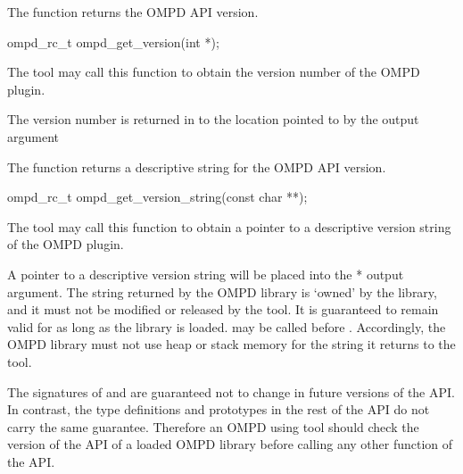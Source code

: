 \label{ompd:ompd_get_version}

\summary
The  function returns the OMPD API version.

\format

\begin{cspecific}
\begin{ompSyntax}
ompd_rc_t ompd_get_version(int *);
\end{ompSyntax}
\end{cspecific}


\descr
The tool may call this function to obtain the version number of the OMPD plugin.

\argdesc
The version number is returned in to the location pointed to by the  output argument 

\label{ompd:ompd_get_version_string}

\summary
The  function returns a descriptive string for the OMPD API version.

\format

\begin{cspecific}
\begin{ompSyntax}
ompd_rc_t ompd_get_version_string(const char **);
\end{ompSyntax}
\end{cspecific}


\descr
The tool may call this function to obtain a pointer to a descriptive version string of the OMPD plugin.

\argdesc
A pointer to a descriptive version string will be placed into the * output argument.
The string returned by the 
OMPD library is `owned' by the library, and it must not be modified or released by the tool.
It is guaranteed to remain valid for as long as the library is loaded. 
may be called before . Accordingly, the OMPD library must not use heap or 
stack memory for the string it returns to the tool.

The signatures of  and  are 
guaranteed not to change in future versions of the API. In contrast, the type definitions and 
prototypes in the rest of the API do not carry the same guarantee. Therefore an OMPD using tool 
should check the version of the API of a loaded OMPD library before calling any other function of 
the API.

